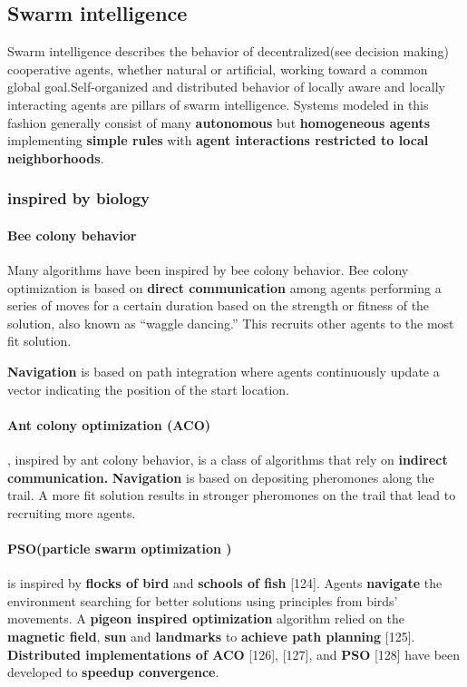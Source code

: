 \documentclass{article}
\begin{document}
		\subsection{Swarm intelligence} 
			Swarm intelligence describes the behavior of decentralized(see decision making) cooperative agents, whether natural or artificial, working toward a common global goal.Self-organized and distributed behavior of locally aware and locally interacting agents are pillars of swarm intelligence. Systems modeled in this fashion generally consist of many \textbf{autonomous} but \textbf{homogeneous agents} implementing \textbf{simple rules} with \textbf{agent interactions restricted to local neighborhoods}.
			\subsubsection{inspired by biology} 
				\paragraph{Bee colony behavior}
				Many algorithms have been inspired by bee colony behavior. Bee colony optimization is based on \textbf{direct communication} among agents performing a series of moves for a certain duration based on the strength or fitness of the solution, also known as “waggle dancing.” This recruits other agents to the most fit solution.
				
				\textbf{Navigation} is based on path integration where agents continuously update a vector indicating the position of the start location.
				\\
				\paragraph{Ant colony optimization (ACO)}, inspired by ant colony behavior, is a class of algorithms that rely on \textbf{indirect communication.}
				\textbf{Navigation} is based on depositing pheromones along the trail. A more fit solution results in stronger pheromones on the trail that lead to recruiting more agents. 
				
				\paragraph{PSO(particle swarm optimization )} is inspired by \textbf{flocks of bird} and \textbf{schools of fish} \citep{rizk-2018-decision-making-in-multiagent-systems-a-survey}[124]. Agents \textbf{navigate} the environment searching for better solutions using principles from birds’ movements. A \textbf{pigeon inspired optimization} algorithm relied on the \textbf{magnetic field}, \textbf{sun} and \textbf{landmarks} to \textbf{achieve path planning} \citep{rizk-2018-decision-making-in-multiagent-systems-a-survey}[125]. 
				\\
				\textbf{Distributed implementations of ACO} \citep{rizk-2018-decision-making-in-multiagent-systems-a-survey}[126], [127], and \textbf{PSO} \citep{rizk-2018-decision-making-in-multiagent-systems-a-survey}[128] have been developed to \textbf{speedup convergence}. 
			
\end{document}
